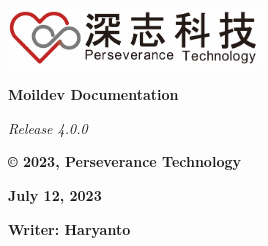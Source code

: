 \documentclass[a4paper]{article}
\begin{document}
\begin{titlepage}
    \begin{FlushRight}
        \RaggedLeft
        \includegraphics[width=0.5\textwidth]{assets/logo.png}\par\vspace{1cm}
        {\Huge \textbf{Moildev Documentation}\par}
        \vspace{0.1cm}
        {\LARGE \textit{Release 4.0.0}\par}
        \vspace{1.5cm}
        {\Large \textbf{© 2023, Perseverance Technology}\par}
        \vspace{0.5cm}
        \vfill
        {\Large \textbf{July 12, 2023}\par}
        \vspace{0.2cm}
        {\large \textbf{Writer: Haryanto}\par}
    \end{FlushRight}
\end{titlepage}
\end{document}
